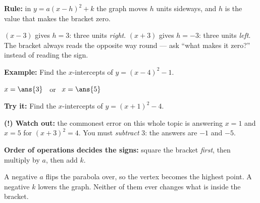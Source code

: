 \documentclass[12pt]{article}
\begin{document}


\begin{formulabox}
\textbf{Rule:} \quad in $y = a(x-h)^2 + k$ the graph moves $h$ units sideways, and $h$ is the value that makes the bracket zero.\par\smallskip
$(x-3)$ gives $h = 3$: three units \emph{right}. $(x+3)$ gives $h = -3$: three units \emph{left}. The bracket always reads the opposite way round --- ask ``what makes it zero?'' instead of reading the sign.
\end{formulabox}

\begin{examplebox}
\textbf{Example:} \quad Find the $x$-intercepts of $y = (x-4)^2 - 1$.
\par
$x = \ans{3}$ \ or \ $x = \ans{5}$
\end{examplebox}

\begin{tryitbox}
\textbf{Try it:} \quad Find the $x$-intercepts of $y = (x+1)^2 - 4$.\\[2pt]
\end{tryitbox}

\begin{watchoutbox}
\textbf{(!) Watch out:} the commonest error on this whole topic is answering $x = 1$ and $x = 5$ for $(x+3)^2 = 4$. You must \emph{subtract} $3$: the answers are $-1$ and $-5$.
\end{watchoutbox}


\begin{formulabox}
\textbf{Order of operations decides the signs:} square the bracket \emph{first}, then multiply by $a$, then add $k$.\par\smallskip
A negative $a$ flips the parabola over, so the vertex becomes the highest point. A negative $k$ lowers the graph. Neither of them ever changes what is inside the bracket.
\end{formulabox}
\end{document}
